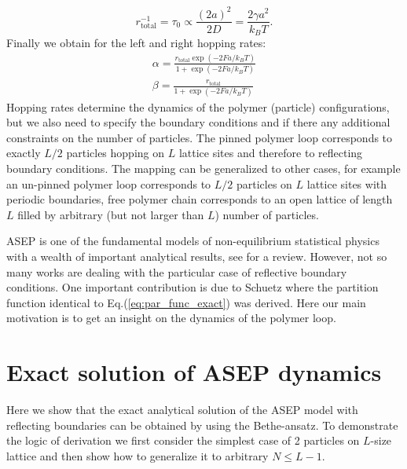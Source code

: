 \documentclass[aps,showpacs,twocolumn,floatfix,prx,superscriptaddress]{revtex4-1}
\begin{document}
\begin{equation}
    \label{eq:timeScale}
    r_{\text{total}}^{-1} = \tau_0 \propto \frac{(2a)^2}{2D} = \frac{2\gamma a^2}{k_{B}T}.
\end{equation}
Finally we obtain for the left and right hopping rates:
\begin{subequations}
    \label{eq:l_and_r}
    \begin{eqnarray}
        \alpha  =   \frac{r_{\text{total}}\exp{(-2Fa / k_B T)}}{1+\exp{(-2Fa / k_B T)}} \\
        \beta  =  \frac{r_{\text{total}}}{1+\exp{(-2Fa / k_B T)}}
    \end{eqnarray}
\end{subequations}
Hopping rates determine the dynamics of the polymer (particle) configurations, but we also need to specify the boundary conditions and if there any additional constraints on the number of particles. The pinned polymer loop corresponds to exactly $L/2$ particles hopping on $L$
lattice sites and therefore to reflecting boundary conditions. The mapping can be generalized to other cases, for example
an un-pinned polymer loop corresponds to $L/2$ particles on $L$ lattice sites with
periodic boundaries, free polymer chain corresponds to an open lattice of length $L$ filled by
arbitrary (but not larger than $L$) number of particles. 

ASEP is one of the fundamental models of non-equilibrium statistical physics with a wealth of important analytical results, see \cite{} for a review. However, not so many works are dealing with the particular case of reflective boundary conditions. One important contribution is due to Schuetz \cite{} where the partition function identical to Eq.(\ref{eq:par_func_exact}) was derived. Here our main motivation is to get an insight on the dynamics of the polymer loop. 

\section{Exact solution of ASEP dynamics}
Here we show that the exact analytical solution of the ASEP model with reflecting boundaries can be obtained by using the Bethe-ansatz. To demonstrate the logic of derivation we first consider the simplest case of 2 particles on $L$-size lattice and then show how to generalize it to arbitrary $N\leq L-1$.
\end{document}
